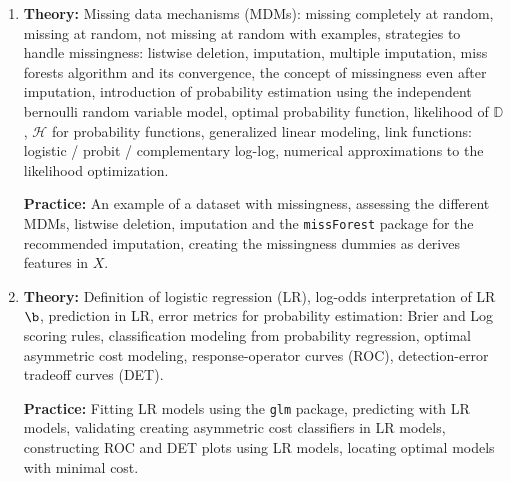 \begin{enumerate}[(1)]
%

\item \textbf{Theory:} Missing data mechanisms (MDMs): missing completely at random, missing at random, not missing at random with examples, strategies to handle missingness: listwise deletion, imputation, multiple imputation, miss forests algorithm and its convergence, the concept of  missingness even after imputation, introduction of probability estimation using the independent bernoulli random variable model, optimal probability function, likelihood of $\mathbb{D}$, $\mathcal{H}$ for probability functions, generalized linear modeling, link functions: logistic / probit / complementary log-log, numerical approximations to the likelihood optimization.

\textbf{Practice:} An example of a dataset with missingness, assessing the different MDMs, listwise deletion, imputation and the \texttt{missForest} package for the recommended imputation, creating the missingness dummies as derives features in $X$.

\item \textbf{Theory:} Definition of logistic regression (LR), log-odds interpretation of LR $\b$, prediction in LR, error metrics for probability estimation: Brier and Log scoring rules, classification modeling from probability regression, optimal asymmetric cost modeling, response-operator curves (ROC), detection-error tradeoff curves (DET).

\textbf{Practice:} Fitting LR models using the \texttt{glm} package, predicting with LR models, validating creating asymmetric cost classifiers in LR models, constructing ROC and DET plots using LR models, locating optimal models with minimal cost. 


\end{enumerate}
